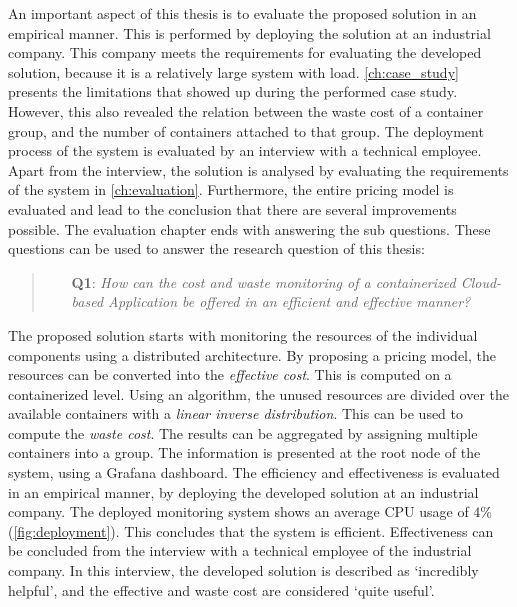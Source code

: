 \noindent
An important aspect of this thesis is to evaluate the proposed solution in an empirical manner. This is performed by deploying the solution at an industrial company. This company meets the requirements for evaluating the developed solution, because it is a relatively large system with load. \autoref{ch:case_study} presents the limitations that showed up during the performed case study. However, this also revealed the relation between the waste cost of a container group, and the number of containers attached to that group. The deployment process of the system is evaluated by an interview with a technical employee.\\

\noindent
Apart from the interview, the solution is analysed by evaluating the requirements of the system in \autoref{ch:evaluation}. Furthermore, the entire pricing model is evaluated and lead to the conclusion that there are several improvements possible. The evaluation chapter ends with answering the sub questions. These questions can be used to answer the research question of this thesis:

\begin{quote}
    \begin{itemize}
        \item[\textbf{Q1}: ]\textit{How can the cost and waste monitoring of a containerized Cloud-based Application be offered in an efficient and effective manner?}
    \end{itemize}
\end{quote}

\noindent
The proposed solution starts with monitoring the resources of the individual components using a distributed architecture. By proposing a pricing model, the resources can be converted into the \textit{effective cost}. This is computed on a containerized level. Using an algorithm, the unused resources are divided over the available containers with a \textit{linear inverse distribution}. This can be used to compute the \textit{waste cost}. The results can be aggregated by assigning multiple containers into a group. The information is presented at the root node of the system, using a Grafana dashboard. The efficiency and effectiveness is evaluated in an empirical manner, by deploying the developed solution at an industrial company. The deployed monitoring system shows an average CPU usage of $4\%$ (\autoref{fig:deployment}). This concludes that the system is efficient. Effectiveness can be concluded from the interview with a technical employee of the industrial company. In this interview, the developed solution is described as `incredibly helpful', and the effective and waste cost are considered `quite useful'.

